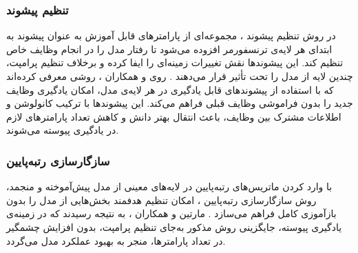 
\subsubsection{تنظیم پیشوند}
 در روش تنظیم پیشوند ، مجموعه‌ای از پارامترهای قابل آموزش به عنوان پیشوند به ابتدای هر لایه‌ی ترنسفورمر افزوده می‌شود تا رفتار مدل را در انجام وظایف خاص تنظیم کند. این پیشوندها نقش تغییرات زمینه‌ای را ایفا کرده و برخلاف تنظیم پرامپت، چندین لایه از مدل را تحت تأثیر قرار می‌دهند \cite{llm_continual}. روی و همکاران \cite{prefix-tuning}، روشی معرفی کرده‌اند که با استفاده از پیشوندهای قابل یادگیری در هر لایه‌ی مدل، امکان یادگیری وظایف جدید را بدون فراموشی وظایف قبلی فراهم می‌کند. این پیشوندها با ترکیب کانولوشن و اطلاعات مشترک بین وظایف، باعث انتقال بهتر دانش و کاهش تعداد پارامترهای لازم در یادگیری پیوسته می‌شوند.
 
\subsubsection{سازگار‌سازی رتبه‌پایین}
 با وارد کردن ماتریس‌های رتبه‌پایین در لایه‌های معینی از مدل پیش‌آموخته و منجمد، روش سازگار‌سازی رتبه‌پایین ، امکان تنظیم هدفمند بخش‌هایی از مدل را بدون بازآموزی کامل فراهم می‌سازد \cite{llm_continual}. مارتین و همکاران \cite{lora}، به نتیجه رسیدند که در زمینه‌ی یادگیری پیوسته، جایگزینی روش مذکور به‌جای تنظیم پرامپت، بدون افزایش چشمگیر در تعداد پارامترها، منجر به بهبود عملکرد مدل می‌گردد.
 
